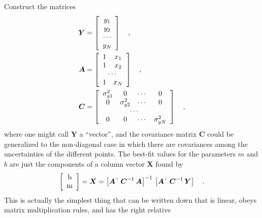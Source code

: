 \documentclass[12pt,twoside]{article}
\newcommand{\mmatrix}[1]{\boldsymbol{#1}}
\newcommand{\inverse}[1]{{#1}^{-1}}
\newcommand{\transpose}[1]{{#1}^{\scriptscriptstyle \top}}
\newcommand{\mA}{\mmatrix{A}}
\newcommand{\mAT}{\transpose{\mA}}
\newcommand{\mC}{\mmatrix{C}}
\newcommand{\mCinv}{\inverse{\mC}}
\newcommand{\mX}{\mmatrix{X}}
\newcommand{\mY}{\mmatrix{Y}}
\begin{document}
Construct the matrices
\begin{align}\label{eq:mY}
\mY &= \left[\begin{array}{c}
y_1 \\
y_2 \\
\cdots \\
y_N
\end{array}\right] \quad ,\\
\mA &= \left[\begin{array}{cc}
1 & x_1 \\
1 & x_2 \\
\multicolumn{2}{c}{\cdots} \\
1 & x_N
\end{array}\right] \quad ,\\
\mC & = \left[\begin{array}{cccc}
\sigma_{y1}^{2} & 0 & \cdots & 0 \\
0 & \sigma_{y2}^{2} & \cdots & 0 \\
\multicolumn{4}{c}{\cdots} \\
0 & 0 & \cdots & \sigma_{yN}^{2}
\end{array}\right] \quad ,\label{eq:covar}
\end{align}
where one might call $\mY$ a ``vector'', and the covariance matrix
$\mC$ could be generalized to the non-diagonal case in which there are
covariances among the uncertainties of the different points.  The
best-fit values for the parameters $m$ and $b$ are just the components
of a column vector $\mX$ found by
\begin{equation}\label{eq:lsf}
\left[\begin{array}{c} $b$ \\ $m$ \end{array}\right]
 = \mX = \inverse{\left[\mAT\,\mCinv\,\mA\right]}
  \,\left[\mAT\,\mCinv\,\mY\right] \quad .
\end{equation}
This is actually the simplest thing that can be written down that is
linear, obeys matrix multiplication rules, and has the right relative
\end{document}
